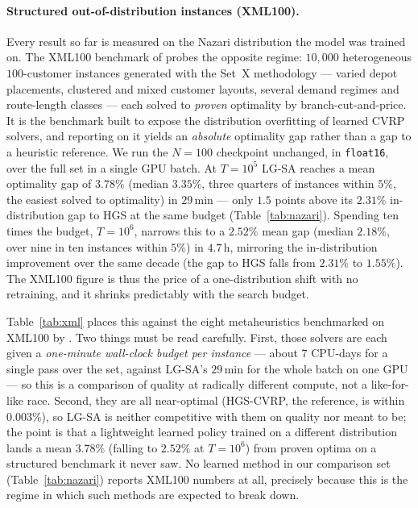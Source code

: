 \documentclass[letterpaper]{article} %
\begin{document}
\paragraph{Structured out-of-distribution instances (XML100).}
Every result so far is measured on the Nazari distribution the model was
trained on. The XML100 benchmark of \citet{queiroga_10000_nodate} probes the
opposite regime: $10{,}000$ heterogeneous $100$-customer instances generated
with the Set~X methodology --- varied depot placements, clustered and mixed
customer layouts, several demand regimes and route-length classes --- each
solved to \emph{proven} optimality by branch-cut-and-price. It is the benchmark
built to expose the distribution overfitting of learned CVRP solvers, and
reporting on it yields an \emph{absolute} optimality gap rather than a gap to a
heuristic reference. We run the $N = 100$ checkpoint unchanged, in
\texttt{float16}, over the full set in a single GPU batch. At $T = 10^{5}$ LG-SA
reaches a mean optimality gap of $3.78\%$ (median $3.35\%$, three quarters of
instances within $5\%$, the easiest solved to optimality) in $29$\,min --- only
$1.5$ points above its $2.31\%$ in-distribution gap to HGS at the same budget
(Table~\ref{tab:nazari}). Spending ten times the budget, $T = 10^{6}$, narrows
this to a $2.52\%$ mean gap (median $2.18\%$, over nine in ten instances within
$5\%$) in $4.7$\,h, mirroring the in-distribution improvement over the same
decade (the gap to HGS falls from $2.31\%$ to $1.55\%$). The XML100 figure is
thus the price of a one-distribution shift with no retraining, and it shrinks
predictably with the search budget.

Table~\ref{tab:xml} places this against the eight metaheuristics benchmarked on
XML100 by \citet{queiroga_xl_2026}. Two things must be read carefully. First,
those solvers are each given a \emph{one-minute wall-clock budget per instance}
--- about $7$ CPU-days for a single pass over the set, against LG-SA's $29$\,min
for the whole batch on one GPU --- so this is a comparison of quality at
radically different compute, not a like-for-like race. Second, they are all
near-optimal (HGS-CVRP, the reference, is within $0.003\%$), so LG-SA is neither
competitive with them on quality nor meant to be; the point is that a
lightweight learned policy trained on a different distribution lands a mean
$3.78\%$ (falling to $2.52\%$ at $T = 10^{6}$) from proven optima on a
structured benchmark it never saw. No learned
method in our comparison set (Table~\ref{tab:nazari}) reports XML100 numbers at
all, precisely because this is the regime in which such methods are expected to
break down.
\end{document}
